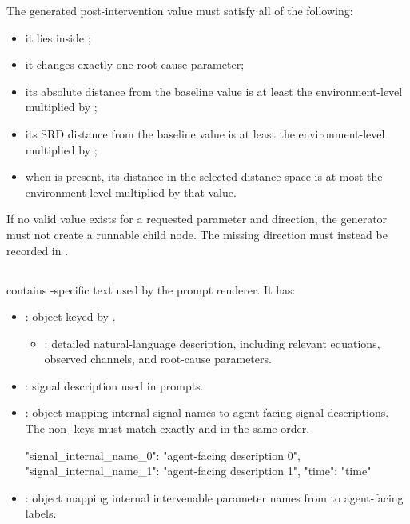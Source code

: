\documentclass[11pt]{article}
\begin{document}
The generated post-intervention value must satisfy all of the following:

\begin{itemize}
\item it lies inside ;
\item it changes exactly one root-cause parameter;
\item its absolute distance from the baseline value is at least the environment-level \termMinAbsDist{} multiplied by ;
\item its SRD distance from the baseline value is at least the environment-level \termMinSRDDistance{} multiplied by ;
\item when  is present, its distance in the
selected distance space is at most the environment-level
\termMinSRDDistance{} multiplied by that value.
\end{itemize}

If no valid value exists for a requested parameter and direction, the generator must not create a runnable child node.
The missing direction must instead be recorded in .

\label{sec:environment-description-levels}
\subsection*{\texorpdfstring{}{description\_levels.json}}

 contains \termSimulator-specific text used by the prompt renderer.
It has:
\begin{itemize}
\item {}: object keyed by \termDescLevel.
\begin{itemize}
\item {}: detailed natural-language description, including relevant equations, observed channels, and root-cause parameters.
\end{itemize}
\item {}: signal description used in prompts.
\item {}: object mapping internal signal names to agent-facing signal descriptions.
The non- keys must match  exactly and in the same order.
\begin{DocCode}
{
  "signal_internal_name_0": "agent-facing description 0",
  "signal_internal_name_1": "agent-facing description 1",
  "time": "time"
}
\end{DocCode}
\item {}: object mapping internal intervenable parameter names from  to agent-facing labels.
\end{itemize}
\end{document}

